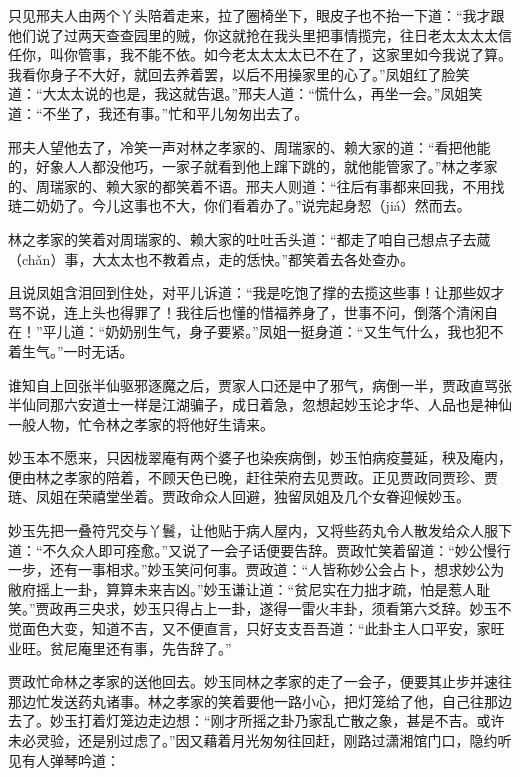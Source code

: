 \documentclass[12pt,oneside]{book}
\begin{document}
只见邢夫人由两个丫头陪着走来，拉了圈椅坐下，眼皮子也不抬一下道：“我才跟他们说了过两天查查园里的贼，你这就抢在我头里把事情揽完，往日老太太太太信任你，叫你管事，我不能不依。如今老太太太太已不在了，这家里如今我说了算。我看你身子不大好，就回去养着罢，以后不用操家里的心了。”凤姐红了脸笑道：“大太太说的也是，我这就告退。”邢夫人道：“慌什么，再坐一会。”凤姐笑道：“不坐了，我还有事。”忙和平儿匆匆出去了。

邢夫人望他去了，冷笑一声对林之孝家的、周瑞家的、赖大家的道：“看把他能的，好象人人都没他巧，一家子就看到他上蹿下跳的，就他能管家了。”林之孝家的、周瑞家的、赖大家的都笑着不语。邢夫人则道：“往后有事都来回我，不用找琏二奶奶了。今儿这事也不大，你们看着办了。”说完起身恝（jiá）然而去。

林之孝家的笑着对周瑞家的、赖大家的吐吐舌头道：“都走了咱自己想点子去蒇（chǎn）事，大太太也不教着点，走的恁快。”都笑着去各处查办。

且说凤姐含泪回到住处，对平儿诉道：“我是吃饱了撑的去揽这些事！让那些奴才骂不说，连上头也得罪了！我往后也懂的惜福养身了，世事不问，倒落个清闲自在！”平儿道：“奶奶别生气，身子要紧。”凤姐一挺身道：“又生气什么，我也犯不着生气。”一时无话。

谁知自上回张半仙驱邪逐魔之后，贾家人口还是中了邪气，病倒一半，贾政直骂张半仙同那六安道士一样是江湖骗子，成日着急，忽想起妙玉论才华、人品也是神仙一般人物，忙令林之孝家的将他好生请来。

妙玉本不愿来，只因栊翠庵有两个婆子也染疾病倒，妙玉怕病疫蔓延，秧及庵内，便由林之孝家的陪着，不顾天色已晚，赶往荣府去见贾政。正见贾政同贾珍、贾琏、凤姐在荣禧堂坐着。贾政命众人回避，独留凤姐及几个女眷迎候妙玉。

妙玉先把一叠符咒交与丫鬟，让他贴于病人屋内，又将些药丸令人散发给众人服下道：“不久众人即可痊愈。”又说了一会子话便要告辞。贾政忙笑着留道：“妙公慢行一步，还有一事相求。”妙玉笑问何事。贾政道：“人皆称妙公会占卜，想求妙公为敝府摇上一卦，算算未来吉凶。”妙玉谦让道：“贫尼实在力拙才疏，怕是惹人耻笑。”贾政再三央求，妙玉只得占上一卦，遂得一雷火丰卦，须看第六爻辞。妙玉不觉面色大变，知道不吉，又不便直言，只好支支吾吾道：“此卦主人口平安，家旺业旺。贫尼庵里还有事，先告辞了。”

贾政忙命林之孝家的送他回去。妙玉同林之孝家的走了一会子，便要其止步并速往那边忙发送药丸诸事。林之孝家的笑着要他一路小心，把灯笼给了他，自己往那边去了。妙玉打着灯笼边走边想：“刚才所摇之卦乃家乱亡散之象，甚是不吉。或许未必灵验，还是别过虑了。”因又藉着月光匆匆往回赶，刚路过潇湘馆门口，隐约听见有人弹琴吟道：
\end{document}
